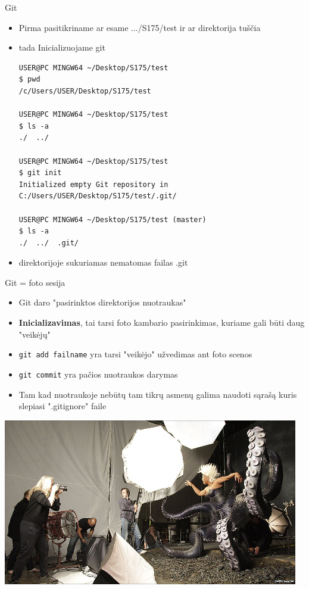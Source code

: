 \documentclass[11pt,xcolor=table]{beamer}
\begin{document}
\begin{frame}[fragile]{Git}
\begin{itemize}
\item Pirma pasitikriname ar esame .../S175/test ir ar direktorija tuščia
\item tada Inicializuojame git
\begin{lstlisting}
USER@PC MINGW64 ~/Desktop/S175/test
$ pwd
/c/Users/USER/Desktop/S175/test

USER@PC MINGW64 ~/Desktop/S175/test
$ ls -a
./  ../

USER@PC MINGW64 ~/Desktop/S175/test
$ git init
Initialized empty Git repository in C:/Users/USER/Desktop/S175/test/.git/

USER@PC MINGW64 ~/Desktop/S175/test (master)
$ ls -a
./  ../  .git/
\end{lstlisting}
\item direktorijoje sukuriamas nematomas failas .git
\end{itemize}
\end{frame}


\begin{frame}{Git = foto sesija}
\begin{itemize}
\item Git daro "pasirinktos direktorijos nuotraukas" 
\item \textbf{Inicializavimas}, tai tarsi foto kambario pasirinkimas, kuriame gali būti daug "veikėjų"
\item \colorbox{listinggray}{\lstinline|git add failname|} yra tarsi "veikėjo" užvedimas ant foto scenos
\item \colorbox{listinggray}{\lstinline|git commit|} yra pačios nuotraukos darymas
\item Tam kad nuotraukoje nebūtų tam tikrų asmenų galima naudoti sąrašą kuris slepiasi ".gitignore" faile
\end{itemize}
\center
\includegraphics[scale=0.4]{photo_session.png}
\end{frame}
\end{document}

